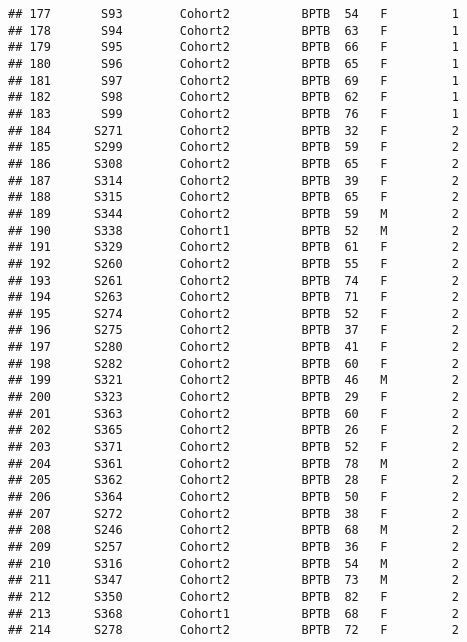 \documentclass[
]{article}
\begin{document}
\begin{verbatim}
## 177       S93        Cohort2          BPTB  54   F         1      
## 178       S94        Cohort2          BPTB  63   F         1      
## 179       S95        Cohort2          BPTB  66   F         1      
## 180       S96        Cohort2          BPTB  65   F         1      
## 181       S97        Cohort2          BPTB  69   F         1      
## 182       S98        Cohort2          BPTB  62   F         1      
## 183       S99        Cohort2          BPTB  76   F         1      
## 184      S271        Cohort2          BPTB  32   F         2      
## 185      S299        Cohort2          BPTB  59   F         2      
## 186      S308        Cohort2          BPTB  65   F         2      
## 187      S314        Cohort2          BPTB  39   F         2      
## 188      S315        Cohort2          BPTB  65   F         2      
## 189      S344        Cohort2          BPTB  59   M         2      
## 190      S338        Cohort1          BPTB  52   M         2      
## 191      S329        Cohort2          BPTB  61   F         2      
## 192      S260        Cohort2          BPTB  55   F         2      
## 193      S261        Cohort2          BPTB  74   F         2      
## 194      S263        Cohort2          BPTB  71   F         2      
## 195      S274        Cohort2          BPTB  52   F         2      
## 196      S275        Cohort2          BPTB  37   F         2      
## 197      S280        Cohort2          BPTB  41   F         2      
## 198      S282        Cohort2          BPTB  60   F         2      
## 199      S321        Cohort2          BPTB  46   M         2      
## 200      S323        Cohort2          BPTB  29   F         2      
## 201      S363        Cohort2          BPTB  60   F         2      
## 202      S365        Cohort2          BPTB  26   F         2      
## 203      S371        Cohort2          BPTB  52   F         2      
## 204      S361        Cohort2          BPTB  78   M         2      
## 205      S362        Cohort2          BPTB  28   F         2      
## 206      S364        Cohort2          BPTB  50   F         2      
## 207      S272        Cohort2          BPTB  38   F         2      
## 208      S246        Cohort2          BPTB  68   M         2      
## 209      S257        Cohort2          BPTB  36   F         2      
## 210      S316        Cohort2          BPTB  54   M         2      
## 211      S347        Cohort2          BPTB  73   M         2      
## 212      S350        Cohort2          BPTB  82   F         2      
## 213      S368        Cohort1          BPTB  68   F         2      
## 214      S278        Cohort2          BPTB  72   F         2      

\end{verbatim}
\end{document}
